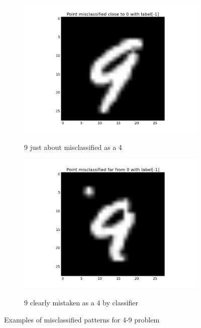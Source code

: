 	\begin{figure}[!ht]
	\centering
	\begin{subfigure}[b]{.45\textwidth}
	\centering
	\includegraphics[width=\textwidth]{mlp/plots/misclassified_fig3.png}
	\label{fig:misclass_3}
	\caption{9 just about misclassified as a 4}
	\end{subfigure}
	\quad
	\begin{subfigure}[b]{.45\textwidth}
	\centering
	\includegraphics[width=\textwidth]{mlp/plots/misclassified_fig4.png}
	\label{fig:misclass_4}
	\caption{9 clearly mistaken as a 4 by classifier}
	\end{subfigure}
	\caption{Examples of misclassified patterns for 4-9 problem}
	\label{fig:misclassification}
	\end{figure}

